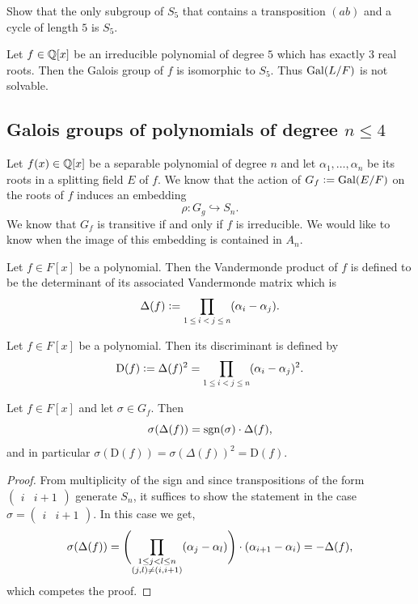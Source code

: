 \documentclass[11pt,a4paper]{article}
\renewcommand{\Dif}{\mathrm{D}}
\begin{document}
\begin{exercise}
  Show that the only subgroup of $S_5$ that contains a transposition $(ab)$
  and a cycle of length $5$ is $S_5$.
\end{exercise}

\begin{proposition}
  Let $f \in \mathbb{Q}[x]$ be an irreducible polynomial of degree $5$ which
  has exactly $3$ real roots.
  Then the Galois group of $f$ is isomorphic to $S_5$.
  Thus $\operatorname{Gal}(L/F)$ is not solvable.
\end{proposition}

\subsection{Galois groups of polynomials of degree 
  \texorpdfstring{$n \le 4$}{n}}

Let $f(x) \in \mathbb{Q}[x]$ be a separable polynomial of degree $n$ and let
$\alpha_1,\dots,\alpha_n$ be its roots in a splitting field $E$ of $f$.
We know that the action of $G_f := \operatorname{Gal}(E/F)$
on the roots of $f$ induces an embedding
\[
  \rho \colon G_g \hookrightarrow S_n.
\]
We know that $G_f$ is transitive if and only if $f$ is irreducible.
We would like to know when the image of this embedding is contained in $A_n$.

\begin{definition}
  Let $f \in F[x]$ be a polynomial.
  Then the Vandermonde product of $f$
  is defined to be the determinant of its associated Vandermonde matrix
  which is
  \[
    \Delta(f) :=
    \prod_{\scalebox{0.7}{$1 \le i < j \le n$}} (\alpha_i - \alpha_j).
  \]
\end{definition}

\begin{definition}[Discriminant]
  Let $f \in F[x]$ be a polynomial.
  Then its discriminant is defined by
  \[
    \Dif(f) := \Delta(f)^2 =
    \prod_{\scalebox{0.7}{$1 \le i < j \le n$}} (\alpha_i - \alpha_j)^2.
  \]
\end{definition}

\begin{lemma}
  Let $f \in F[x]$ and let $\sigma \in G_f$.
  Then
  \[
    \sigma(\Delta(f)) = \operatorname{sgn}(\sigma) \cdot \Delta(f),
  \]
  and in particular $\sigma(\Dif(f)) = \sigma(\Delta(f))^2 = \Dif(f)$.
\end{lemma}
\begin{proof}
  From multiplicity of the sign and since transpositions of the form
  $\begin{pmatrix} i & i+1 \end{pmatrix}$
  generate $S_n$, it suffices to show the statement in the case
  $\sigma = \begin{pmatrix} i & i+1 \end{pmatrix}$.
  In this case we get,
  \[
    \sigma(\Delta(f)) =
    \del[4]{\prod_{\substack{1 \le j < l \le n \\ (j,l) \neq (i,i+1)}}
      (\alpha_j - \alpha_l)} \cdot (\alpha_{i+1} - \alpha_{i}) =
    -\Delta(f),
  \]
  which competes the proof.
\end{proof}
\end{document}
